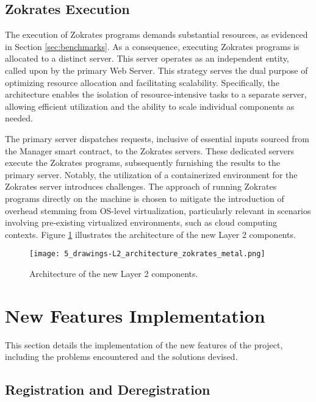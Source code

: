 \subsection{Zokrates Execution}
The execution of Zokrates programs demands substantial resources, as evidenced in Section \ref{sec:benchmarks}. As a consequence, executing Zokrates programs is allocated to a distinct server. This server operates as an independent entity, called upon by the primary Web Server. This strategy serves the dual purpose of optimizing resource allocation and facilitating scalability. Specifically, the architecture enables the isolation of resource-intensive tasks to a separate server, allowing efficient utilization and the ability to scale individual components as needed.

The primary server dispatches requests, inclusive of essential inputs sourced from the Manager smart contract, to the Zokrates servers. These dedicated servers execute the Zokrates programs, subsequently furnishing the results to the primary server. Notably, the utilization of a containerized environment for the Zokrates server introduces challenges. The approach of running Zokrates programs directly on the machine is chosen to mitigate the introduction of overhead stemming from OS-level virtualization, particularly relevant in scenarios involving pre-existing virtualized environments, such as cloud computing contexts. Figure \ref{fig:5_drawings-L2_architecture_zokrates_metal} illustrates the architecture of the new Layer 2 components.

\begin{figure}[ht]
	\centering
	\texttt{[image: 5\_drawings-L2\_architecture\_zokrates\_metal.png]}
	\caption[Scaling Solutions]{Architecture of the new Layer 2 components.}  
	\label{fig:5_drawings-L2_architecture_zokrates_metal}
  \end{figure} 


\section{New Features Implementation}
This section details the implementation of the new features of the project, including the problems encountered and the solutions devised.

\subsection{Registration and Deregistration}

